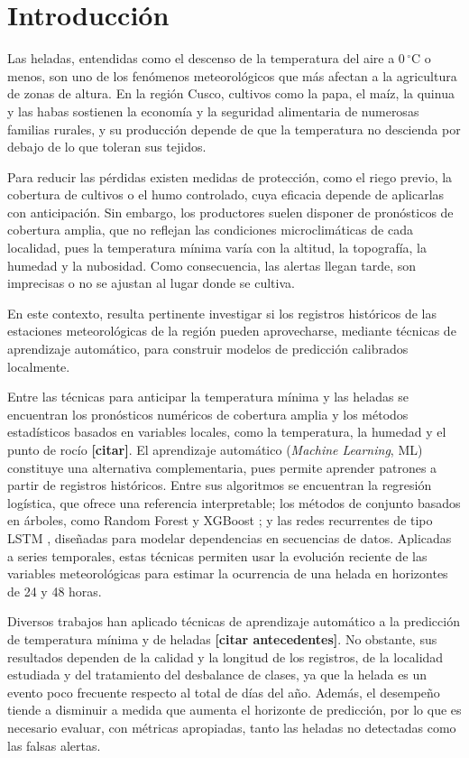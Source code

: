 \section{Introducción}

Las heladas, entendidas como el descenso de la temperatura del aire a $0\,^\circ$C o menos, son uno de los fenómenos meteorológicos que más afectan a la agricultura de zonas de altura. En la región Cusco, cultivos como la papa, el maíz, la quinua y las habas sostienen la economía y la seguridad alimentaria de numerosas familias rurales, y su producción depende de que la temperatura no descienda por debajo de lo que toleran sus tejidos.

Para reducir las pérdidas existen medidas de protección, como el riego previo, la cobertura de cultivos o el humo controlado, cuya eficacia depende de aplicarlas con anticipación. Sin embargo, los productores suelen disponer de pronósticos de cobertura amplia, que no reflejan las condiciones microclimáticas de cada localidad, pues la temperatura mínima varía con la altitud, la topografía, la humedad y la nubosidad. Como consecuencia, las alertas llegan tarde, son imprecisas o no se ajustan al lugar donde se cultiva.

En este contexto, resulta pertinente investigar si los registros históricos de las estaciones meteorológicas de la región pueden aprovecharse, mediante técnicas de aprendizaje automático, para construir modelos de predicción calibrados localmente.

Entre las técnicas para anticipar la temperatura mínima y las heladas se encuentran los pronósticos numéricos de cobertura amplia y los métodos estadísticos basados en variables locales, como la temperatura, la humedad y el punto de rocío \textbf{[citar]}. El aprendizaje automático (\textit{Machine Learning}, ML) constituye una alternativa complementaria, pues permite aprender patrones a partir de registros históricos. Entre sus algoritmos se encuentran la regresión logística, que ofrece una referencia interpretable; los métodos de conjunto basados en árboles, como Random Forest \parencite{breiman2001} y XGBoost \parencite{chen2016}; y las redes recurrentes de tipo LSTM \parencite{hochreiter1997}, diseñadas para modelar dependencias en secuencias de datos. Aplicadas a series temporales, estas técnicas permiten usar la evolución reciente de las variables meteorológicas para estimar la ocurrencia de una helada en horizontes de 24 y 48 horas.

Diversos trabajos han aplicado técnicas de aprendizaje automático a la predicción de temperatura mínima y de heladas \textbf{[citar antecedentes]}. No obstante, sus resultados dependen de la calidad y la longitud de los registros, de la localidad estudiada y del tratamiento del desbalance de clases, ya que la helada es un evento poco frecuente respecto al total de días del año. Además, el desempeño tiende a disminuir a medida que aumenta el horizonte de predicción, por lo que es necesario evaluar, con métricas apropiadas, tanto las heladas no detectadas como las falsas alertas.

